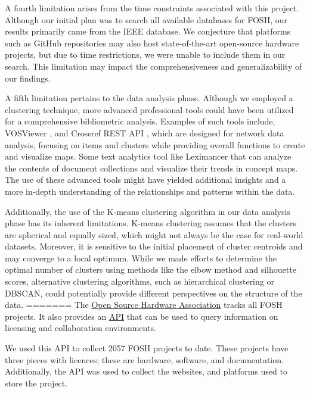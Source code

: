 \documentclass[final-report.tex]{subfiles}
\begin{document}
A fourth limitation arises from the time constraints associated with this project. Although our initial plan was to search all available databases for FOSH, our results primarily came from the IEEE database. We conjecture that platforms such as GitHub repositories may also host state-of-the-art open-source hardware projects, but due to time restrictions, we were unable to include them in our search. This limitation may impact the comprehensiveness and generalizability of our findings.

A fifth limitation pertains to the data analysis phase. Although we employed a clustering technique, more advanced professional tools could have been utilized for a comprehensive bibliometric analysis. Examples of such tools include, VOSViewer \cite{van2013vosviewer}, and Crossref REST API \cite{lammey2016using}, which are designed for network data analysis, focusing on items and clusters while providing overall functions to create and visualize maps. Some text analytics tool like Leximancer \cite{sotiriadou2014choosing} that can analyze the contents of document collections and visualize their trends in concept maps. The use of these advanced tools might have yielded additional insights and a more in-depth understanding of the relationships and patterns within the data.

Additionally, the use of the K-means clustering algorithm in our data analysis phase has its inherent limitations. K-means clustering assumes that the clusters are spherical and equally sized, which might not always be the case for real-world datasets. Moreover, it is sensitive to the initial placement of cluster centroids and may converge to a local optimum. While we made efforts to determine the optimal number of clusters using methods like the elbow method and silhouette scores, alternative clustering algorithms, such as hierarchical clustering or DBSCAN, could potentially provide different perspectives on the structure of the data.
=======
The 
\href{https://www.oshwa.org/}{Open Source Hardware Association} 
tracks all FOSH projects. 
It also provides an 
\href{https://certificationapi.oshwa.org/documentation}{API}
that can be used to query information on licensing and collaboration environments.

We used this API to collect 
2057 
FOSH projects to date.
These projects have three pieces with licences; these are hardware, software, and documentation. 
Additionally, the API was used to collect the websites, and platforms used to store the project. 

\end{document}
